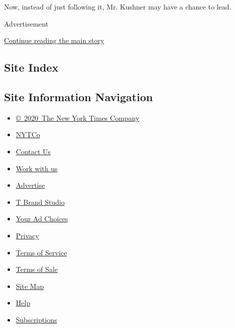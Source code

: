 Now, instead of just following it, Mr. Kushner may have a chance to
lead.

Advertisement

\protect\hyperlink{after-bottom}{Continue reading the main story}

\hypertarget{site-index}{%
\subsection{Site Index}\label{site-index}}

\hypertarget{site-information-navigation}{%
\subsection{Site Information
Navigation}\label{site-information-navigation}}

\begin{itemize}
\tightlist
\item
  \href{https://help.nytimes.com/hc/en-us/articles/115014792127-Copyright-notice}{©~2020~The
  New York Times Company}
\end{itemize}

\begin{itemize}
\tightlist
\item
  \href{https://www.nytco.com/}{NYTCo}
\item
  \href{https://help.nytimes.com/hc/en-us/articles/115015385887-Contact-Us}{Contact
  Us}
\item
  \href{https://www.nytco.com/careers/}{Work with us}
\item
  \href{https://nytmediakit.com/}{Advertise}
\item
  \href{http://www.tbrandstudio.com/}{T Brand Studio}
\item
  \href{https://www.nytimes.com/privacy/cookie-policy\#how-do-i-manage-trackers}{Your
  Ad Choices}
\item
  \href{https://www.nytimes.com/privacy}{Privacy}
\item
  \href{https://help.nytimes.com/hc/en-us/articles/115014893428-Terms-of-service}{Terms
  of Service}
\item
  \href{https://help.nytimes.com/hc/en-us/articles/115014893968-Terms-of-sale}{Terms
  of Sale}
\item
  \href{https://spiderbites.nytimes.com}{Site Map}
\item
  \href{https://help.nytimes.com/hc/en-us}{Help}
\item
  \href{https://www.nytimes.com/subscription?campaignId=37WXW}{Subscriptions}
\end{itemize}
